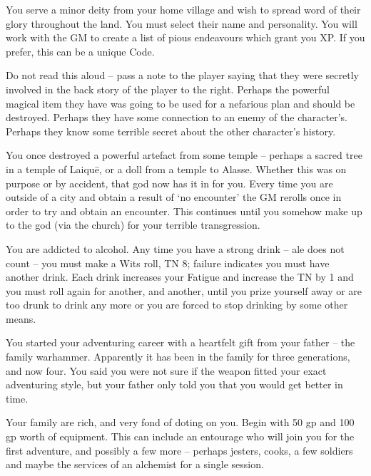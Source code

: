 \begin{multicols}{2}
\begin{list}{\addtocounter{list}{1}\textbf{:}}{\raggedleft}
\item{You serve a minor deity from your home village and wish to spread word of their glory throughout the land.  You must select their name and personality.  You will work with the GM to create a list of pious endeavours which grant you XP.  If you prefer, this can be a unique Code.}

\item{Do not read this aloud -- pass a note to the player saying that they were secretly involved in the back story of the player to the right.  Perhaps the powerful magical item they have was going to be used for a nefarious plan and should be destroyed.  Perhaps they have some connection to an enemy of the character's.  Perhaps they know some terrible secret about the other character's history.}

\item{You once destroyed a powerful artefact from some temple -- perhaps a sacred tree in a temple of Laiqu\"{e}, or a doll from a temple to Alasse. Whether this was on purpose or by accident, that god now has it in for you.  Every time you are outside of a city and obtain a result of `no encounter' the GM rerolls once in order to try and obtain an encounter. This continues until you somehow make up to the god (via the church) for your terrible transgression.}

\item{You are addicted to alcohol.  Any time you have a strong drink -- ale does not count -- you must make a Wits roll, TN 8; failure indicates you must have another drink.  Each drink increases your Fatigue and increase the TN by 1 and you must roll again for another, and another, until you prize yourself away or are too drunk to drink any more or you are forced to stop drinking by some other means.}

\item{You started your adventuring career with a heartfelt gift from your father -- the family warhammer.  Apparently it has been in the family for three generations, and now four.  You said you were not sure if the weapon fitted your exact adventuring style, but your father only told you that you would get better in time.}

\item{Your family are rich, and very fond of doting on you.  Begin with 50 gp and 100 gp worth of equipment.  This can include an entourage who will join you for the first adventure, and possibly a few more -- perhaps jesters, cooks, a few soldiers and maybe the services of an alchemist for a single session.}


\end{list}
\end{multicols}
